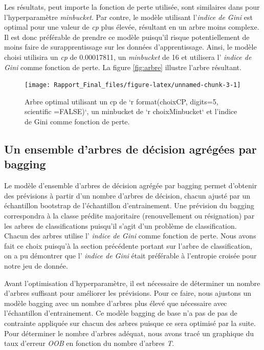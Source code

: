 \documentclass[]{article}
\begin{document}
Les résultats, peut importe la fonction de perte utilisée, sont
similaires dans pour l'hyperparamètre \emph{minbucket}. Par contre, le
modèle utilisant l'\emph{indice de Gini} est optimal pour une valeur de
\emph{cp} plus élevée, résultant en un arbre moins complexe. Il est donc
préférable de prendre ce modèle puisqu'il risque potentiellement de
moins faire de surapprentissage sur les données d'apprentissage. Ainsi,
le modèle choisi utilisira un \emph{cp} de 0.00017811, un
\emph{minbucket} de 16 et utilisera l' \emph{indice de Gini} comme
fonction de perte. La figure \autoref{fig:arbre} illustre l'arbre
résultant.

\begin{figure}

{\centering \texttt{[image: Rapport\_Final\_files/figure-latex/unnamed-chunk-3-1]} 

}

\caption{\label{fig:arbre} Arbre optimal utilisant un cp de `r format(choixCP, digits=5, scientific =FALSE)`, un minbucket de `r choixMinbucket` et l'indice de Gini comme fonction de perte.}\label{fig:unnamed-chunk-3}
\end{figure}

\newpage

\subsection{Un ensemble d'arbres de décision agrégées par
bagging}\label{un-ensemble-darbres-de-duxe9cision-agruxe9guxe9es-par-bagging}

Le modèle d'ensemble d'arbres de décision agrégée par bagging permet
d'obtenir des prévisions à partir d'un nombre d'arbres de décision,
chacun ajusté par un échantillon bootstrap de l'échantillon
d'entrainement. Une prévision du bagging correspondra à la classe
prédite majoritaire (renouvellement ou résignation) par les arbres de
classifications puisqu'il s'agit d'un problème de classification. Chacun
des arbres utilise l' \emph{indice de Gini} comme fonction de perte.
Nous avons fait ce choix puisqu'à la section précédente portant sur
l'arbre de classification, on a pu démontrer que l' \emph{indice de
Gini} était préférable à l'entropie croisée pour notre jeu de donnée.

Avant l'optimisation d'hyperparamètre, il est nécessaire de déterminer
un nombre d'arbres suffisant pour améliorer les prévisions. Pour ce
faire, nous ajustons un modèle bagging avec un nombre d'arbres plus
élevé que nécessaire avec l'échantillon d'entrainement. Ce modèle
bagging de base n'a pas de pas de contrainte appliquée sur chacun des
arbres puisque ce sera optimisé par la suite. Pour déterminer le nombre
d'arbres adéquat, nous avons tracé un graphique du taux d'erreur
\emph{OOB} en fonction du nombre d'arbres \emph{T}.
\end{document}
